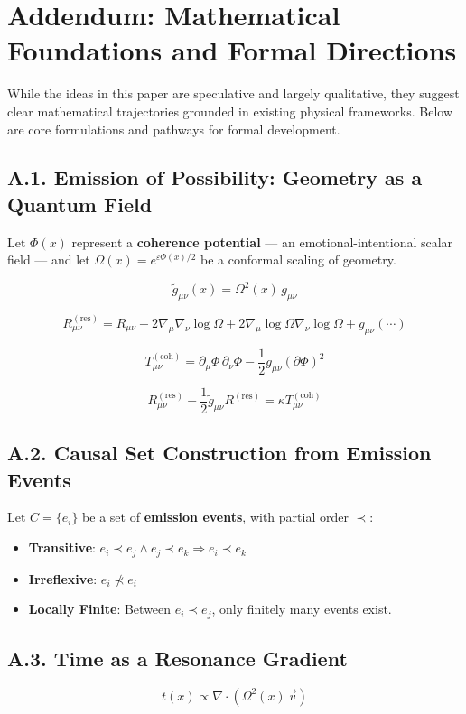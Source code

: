 \clearpage
\section*{Addendum: Mathematical Foundations and Formal Directions}

While the ideas in this paper are speculative and largely qualitative, they suggest clear mathematical trajectories grounded in existing physical frameworks. Below are core formulations and pathways for formal development.

\subsection*{A.1. Emission of Possibility: Geometry as a Quantum Field}
Let \( \Phi(x) \) represent a \textbf{coherence potential} — an emotional-intentional scalar field — and let \( \Omega(x) = e^{\varepsilon \Phi(x)/2} \) be a conformal scaling of geometry.

\[
\tilde{g}_{\mu\nu}(x) = \Omega^2(x)\, g_{\mu\nu}
\]

\[
R^{(\text{res})}_{\mu\nu} = R_{\mu\nu} - 2\nabla_\mu \nabla_\nu \log \Omega + 2 \nabla_\mu \log \Omega \nabla_\nu \log \Omega + g_{\mu\nu} (\cdots)
\]

\[
T^{(\text{coh})}_{\mu\nu} = \partial_\mu \Phi\, \partial_\nu \Phi - \frac{1}{2} g_{\mu\nu} (\partial \Phi)^2
\]

\[
R^{(\text{res})}_{\mu\nu} - \frac{1}{2} \tilde{g}_{\mu\nu} R^{(\text{res})} = \kappa T^{(\text{coh})}_{\mu\nu}
\]

\subsection*{A.2. Causal Set Construction from Emission Events}
Let \( C = \{ e_i \} \) be a set of \textbf{emission events}, with partial order \( \prec \):

\begin{itemize}[noitemsep,topsep=0.5em]
\item \textbf{Transitive}: \( e_i \prec e_j \land e_j \prec e_k \Rightarrow e_i \prec e_k \)
\item \textbf{Irreflexive}: \( e_i \nprec e_i \)
\item \textbf{Locally Finite}: Between \( e_i \prec e_j \), only finitely many events exist.
\end{itemize}

\subsection*{A.3. Time as a Resonance Gradient}
\[
t(x) \propto \nabla \cdot \left(\Omega^2(x)\, \vec{v}\right)
\]

